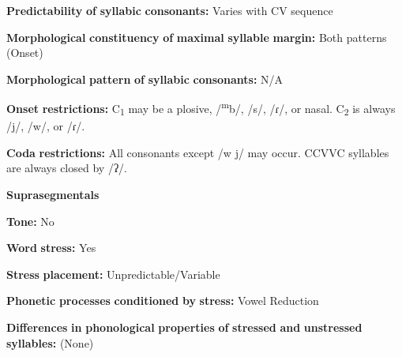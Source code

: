\documentclass[output=paper]{langsci/langscibook}
\begin{document}
\begin{styleBody}
\textbf{Predictability} \textbf{of} \textbf{syllabic} \textbf{consonants:} Varies with CV sequence
\end{styleBody}

\begin{styleBody}
\textbf{Morphological} \textbf{constituency} \textbf{of} \textbf{maximal} \textbf{syllable} \textbf{margin:} Both patterns (Onset)
\end{styleBody}

\begin{styleBody}
\textbf{Morphological} \textbf{pattern} \textbf{of} \textbf{syllabic} \textbf{consonants:} N/A
\end{styleBody}

\begin{styleBody}
\textbf{Onset} \textbf{restrictions:} C\textsubscript{1} may be a plosive, /\textsuperscript{m}b/, /s/, /ɾ/, or nasal. C\textsubscript{2} is always /j/, /w/, or /ɾ/.
\end{styleBody}

\begin{styleBody}
\textbf{Coda} \textbf{restrictions:} All consonants except /w j/ may occur. CCVVC syllables are always closed by /ʔ/.
\end{styleBody}

\begin{styleBody}
\textbf{Suprasegmentals}
\end{styleBody}

\begin{styleBody}
\textbf{Tone:} No
\end{styleBody}

\begin{styleBody}
\textbf{Word} \textbf{stress:} Yes
\end{styleBody}

\begin{styleBody}
\textbf{Stress} \textbf{placement:} Unpredictable/Variable
\end{styleBody}

\begin{styleBody}
\textbf{Phonetic} \textbf{processes} \textbf{conditioned} \textbf{by} \textbf{stress:} Vowel Reduction
\end{styleBody}

\begin{styleBody}
\textbf{Differences} \textbf{in} \textbf{phonological} \textbf{properties} \textbf{of} \textbf{stressed} \textbf{and} \textbf{unstressed} \textbf{syllables:} (None)
\end{styleBody}
\end{document}
